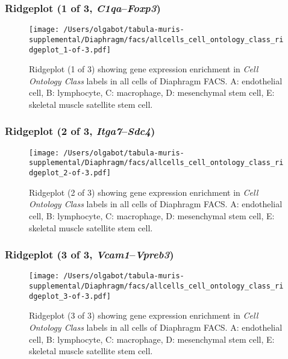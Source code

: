 \subsubsection{Ridgeplot (1 of 3, \emph{C1qa}--\emph{Foxp3})}
\begin{figure}[h]
\centering
\texttt{[image: /Users/olgabot/tabula-muris-supplemental/Diaphragm/facs/allcells\_cell\_ontology\_class\_ridgeplot\_1-of-3.pdf]}

\caption{ Ridgeplot (1 of 3)  showing gene expression enrichment in \emph{Cell Ontology Class} labels in all cells of Diaphragm FACS. A: endothelial cell, B: lymphocyte, C: macrophage, D: mesenchymal stem cell, E: skeletal muscle satellite stem cell.}
\end{figure}


\clearpage

\subsubsection{Ridgeplot (2 of 3, \emph{Itga7}--\emph{Sdc4})}
\begin{figure}[h]
\centering
\texttt{[image: /Users/olgabot/tabula-muris-supplemental/Diaphragm/facs/allcells\_cell\_ontology\_class\_ridgeplot\_2-of-3.pdf]}

\caption{ Ridgeplot (2 of 3)  showing gene expression enrichment in \emph{Cell Ontology Class} labels in all cells of Diaphragm FACS. A: endothelial cell, B: lymphocyte, C: macrophage, D: mesenchymal stem cell, E: skeletal muscle satellite stem cell.}
\end{figure}


\clearpage

\subsubsection{Ridgeplot (3 of 3, \emph{Vcam1}--\emph{Vpreb3})}
\begin{figure}[h]
\centering
\texttt{[image: /Users/olgabot/tabula-muris-supplemental/Diaphragm/facs/allcells\_cell\_ontology\_class\_ridgeplot\_3-of-3.pdf]}

\caption{ Ridgeplot (3 of 3)  showing gene expression enrichment in \emph{Cell Ontology Class} labels in all cells of Diaphragm FACS. A: endothelial cell, B: lymphocyte, C: macrophage, D: mesenchymal stem cell, E: skeletal muscle satellite stem cell.}
\end{figure}


\clearpage

